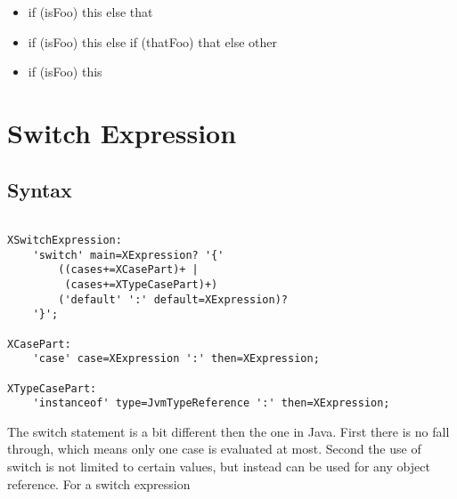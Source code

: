 \documentclass[a4paper,10pt]{scrreprt}
\newlength{\itemindentlen}
\begin{document}
\setlength{\itemindentlen}{\textwidth}
\begin{itemize}
\addtolength{\itemindentlen}{-2em}

\item \begin{minipage}[t]{\itemindentlen}
if (isFoo) this else that
\end{minipage}

\item \begin{minipage}[t]{\itemindentlen}
if (isFoo) this else if (thatFoo) that else other
\end{minipage}

\item \begin{minipage}[t]{\itemindentlen}
if (isFoo) this
\end{minipage}

\end{itemize}
\addtolength{\itemindentlen}{2em}







\section{Switch Expression}
\label{SwitchExpression}



\subsection{ Syntax }


\begin{lstlisting}

XSwitchExpression:
	'switch' main=XExpression? '{'
		((cases+=XCasePart)+ |
		 (cases+=XTypeCasePart)+)
		('default' ':' default=XExpression)?
	'}';

XCasePart:
	'case' case=XExpression ':' then=XExpression;	

XTypeCasePart:
	'instanceof' type=JvmTypeReference ':' then=XExpression;	

\end{lstlisting}


The switch statement is a bit different then the one in Java. First there is no fall through, which means only one case is evaluated at most.
Second the use of switch is not limited to certain values, but instead can be used for any object reference. 
For a switch expression 
\end{document}
